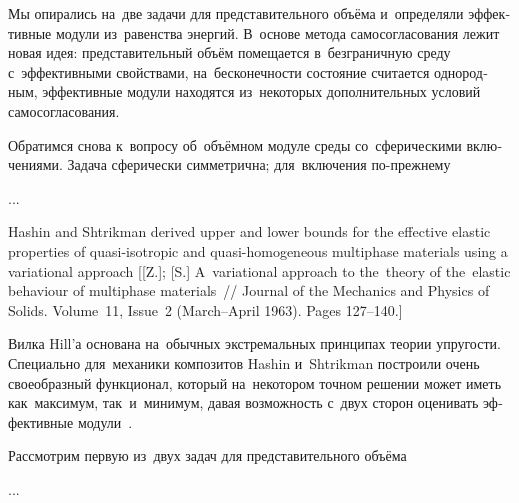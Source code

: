 

\begin{otherlanguage}{russian}

Мы опирались на~две задачи для представительного объёма и~определяли эффективные модули из~равенства энергий. В~\hbox{основе} метода самосогласования лежит новая идея: представительный объём помещается в~безграничную среду с~эффективными свойствами, на~бесконечности состояние считается однородным, эффективные модули находятся из~некоторых дополнительных условий самосогласования.

Обратимся снова к~вопросу об~объёмном модуле среды со~сферическими включениями. Задача сферически симметрична; для~включения по\hbox{-}прежнему

...



\end{otherlanguage}



{\small \noindent Hashin and Shtrikman derived upper and lower bounds for the effective elastic properties of quasi-isotropic and quasi-homogeneous multiphase materials using a variational approach [[Z.]; [S.] A~variational approach to the~theory of the~elastic behaviour of multiphase materials~// Journal of the Mechanics and Physics of Solids. Volume~11, Issue~2 (March--April 1963). Pages 127\hbox{--}140.]
\par}

\begin{otherlanguage}{russian}

Вилка Hill’а основана на~обычных экстремальных принципах теории упругости. Специально для~механики композитов Hashin и~Shtrikman построили очень своеобразный функционал, который на~некотором точном решении может иметь как~максимум, так~и~минимум, давая возможность с~двух сторон оценивать эффективные модули~\cite{shermergor}.

Рассмотрим первую из~двух задач для представительного объёма

...



\end{otherlanguage}

